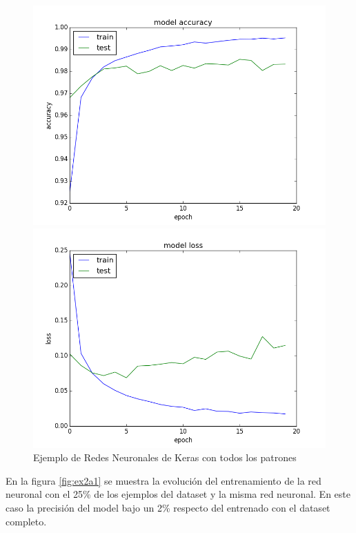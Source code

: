 \documentclass[11pt,spanish]{article}
\begin{document}
\begin{figure}[htpb]
\centering
\begin{minipage}{.5\textwidth}
  \centering
  \includegraphics[width=1\linewidth]{../keras_example_acc.png}
\end{minipage}%
\begin{minipage}{.5\textwidth}
  \centering
  \includegraphics[width=1\linewidth]{../keras_example_loss.png}
\end{minipage}
\caption{Ejemplo de Redes Neuronales de Keras con todos los patrones}
\label{fig:keras_example_history}
\end{figure}

En la figura \ref{fig:ex2a1} se muestra la evolución del entrenamiento de la red neuronal con el 25\% de los ejemplos del dataset y la misma red neuronal. En este caso la precisión del model bajo un 2\% respecto del entrenado con el dataset completo. \par
\end{document}
